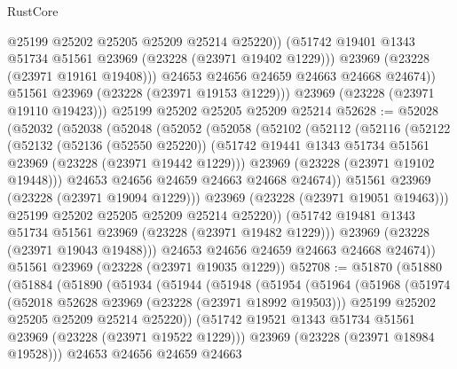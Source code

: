\begin{lexlean}{RustCore}
\begin{coremodule}
                  @25199
                  @25202
                  @25205
                  @25209
                  @25214
                  @25220))
              (@51742 @19401 @1343 @51734 @51561 @23969 (@23228 (@23971 @19402 @1229)))
              @23969
              (@23228 (@23971 @19161 @19408)))
            @24653
            @24656
            @24659
            @24663
            @24668
            @24674))
        @51561
        @23969
        (@23228 (@23971 @19153 @1229)))
      @23969
      (@23228 (@23971 @19110 @19423)))
    @25199
    @25202
    @25205
    @25209
    @25214
@52628 := @52028
    (@52032
      (@52038
        (@52048
          (@52052
            (@52058
              (@52102
                (@52112
                  (@52116
                    (@52122
                      (@52132
                        (@52136 (@52550 @25220))
                        (@51742 @19441 @1343 @51734 @51561 @23969 (@23228 (@23971 @19442 @1229)))
                        @23969
                        (@23228 (@23971 @19102 @19448)))
                      @24653
                      @24656
                      @24659
                      @24663
                      @24668
                      @24674))
                  @51561
                  @23969
                  (@23228 (@23971 @19094 @1229)))
                @23969
                (@23228 (@23971 @19051 @19463)))
              @25199
              @25202
              @25205
              @25209
              @25214
              @25220))
          (@51742 @19481 @1343 @51734 @51561 @23969 (@23228 (@23971 @19482 @1229)))
          @23969
          (@23228 (@23971 @19043 @19488)))
        @24653
        @24656
        @24659
        @24663
        @24668
        @24674))
    @51561
    @23969
    (@23228 (@23971 @19035 @1229))
@52708 := @51870
    (@51880
      (@51884
        (@51890
          (@51934
            (@51944
              (@51948
                (@51954
                  (@51964
                    (@51968
                      (@51974
                        (@52018 @52628 @23969 (@23228 (@23971 @18992 @19503)))
                        @25199
                        @25202
                        @25205
                        @25209
                        @25214
                        @25220))
                    (@51742 @19521 @1343 @51734 @51561 @23969 (@23228 (@23971 @19522 @1229)))
                    @23969
                    (@23228 (@23971 @18984 @19528)))
                  @24653
                  @24656
                  @24659
                  @24663

\end{coremodule}
\end{lexlean}
